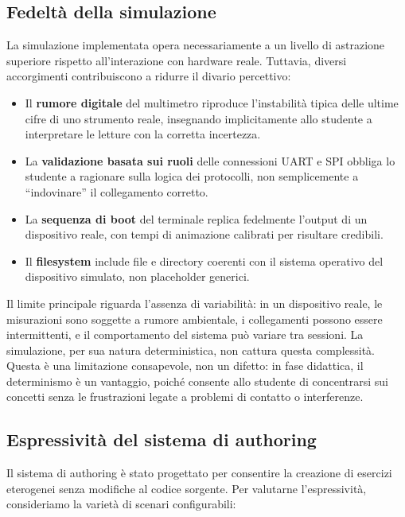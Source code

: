 \subsection{Fedeltà della simulazione}

La simulazione implementata opera necessariamente a un livello di astrazione superiore rispetto all'interazione con hardware reale. Tuttavia, diversi accorgimenti contribuiscono a ridurre il divario percettivo:

\begin{itemize}
    \item Il \textbf{rumore digitale} del multimetro riproduce l'instabilità tipica delle ultime cifre di uno strumento reale, insegnando implicitamente allo studente a interpretare le letture con la corretta incertezza.
    \item La \textbf{validazione basata sui ruoli} delle connessioni UART e SPI obbliga lo studente a ragionare sulla logica dei protocolli, non semplicemente a ``indovinare'' il collegamento corretto.
    \item La \textbf{sequenza di boot} del terminale replica fedelmente l'output di un dispositivo reale, con tempi di animazione calibrati per risultare credibili.
    \item Il \textbf{filesystem} include file e directory coerenti con il sistema operativo del dispositivo simulato, non placeholder generici.
\end{itemize}

Il limite principale riguarda l'assenza di variabilità: in un dispositivo reale, le misurazioni sono soggette a rumore ambientale, i collegamenti possono essere intermittenti, e il comportamento del sistema può variare tra sessioni. La simulazione, per sua natura deterministica, non cattura questa complessità. Questa è una limitazione consapevole, non un difetto: in fase didattica, il determinismo è un vantaggio, poiché consente allo studente di concentrarsi sui concetti senza le frustrazioni legate a problemi di contatto o interferenze.

\subsection{Espressività del sistema di authoring}

Il sistema di authoring è stato progettato per consentire la creazione di esercizi eterogenei senza modifiche al codice sorgente. Per valutarne l'espressività, consideriamo la varietà di scenari configurabili:

